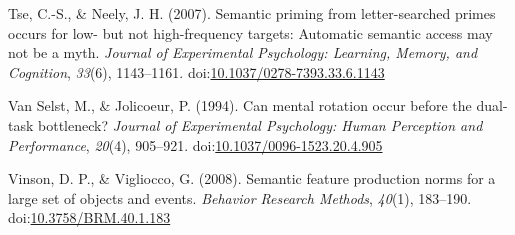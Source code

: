 \documentclass[english,man]{apa6}
\theoremstyle{definition}
\theoremstyle{definition}
\theoremstyle{definition}
\theoremstyle{remark}
\begin{document}
\hypertarget{ref-Tse2007}{}
Tse, C.-S., \& Neely, J. H. (2007). Semantic priming from
letter-searched primes occurs for low- but not high-frequency targets:
Automatic semantic access may not be a myth. \emph{Journal of
Experimental Psychology: Learning, Memory, and Cognition}, \emph{33}(6),
1143--1161.
doi:\href{https://doi.org/10.1037/0278-7393.33.6.1143}{10.1037/0278-7393.33.6.1143}

\hypertarget{ref-VanSelst1994}{}
Van Selst, M., \& Jolicoeur, P. (1994). Can mental rotation occur before
the dual-task bottleneck? \emph{Journal of Experimental Psychology:
Human Perception and Performance}, \emph{20}(4), 905--921.
doi:\href{https://doi.org/10.1037/0096-1523.20.4.905}{10.1037/0096-1523.20.4.905}

\hypertarget{ref-Vinson2008}{}
Vinson, D. P., \& Vigliocco, G. (2008). Semantic feature production
norms for a large set of objects and events. \emph{Behavior Research
Methods}, \emph{40}(1), 183--190.
doi:\href{https://doi.org/10.3758/BRM.40.1.183}{10.3758/BRM.40.1.183}
\end{document}
